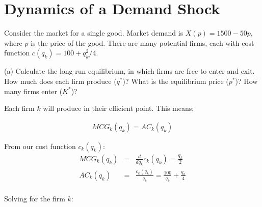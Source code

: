 \section{Dynamics of a Demand Shock}

Consider the market for a single good. Market demand is \( X(p) = 1500 - 50p \), where \( p \) is the price of the good. There are many potential firms, each with cost function \( c(q_k) = 100 + q_k^2/4 \).

\begin{tcolorbox}
    (a) Calculate the long-run equilibrium, in which firms are free to enter and exit. How much does each firm produce (\( q^* \))? What is the equilibrium price (\( p^* \))? How many firms enter (\( K^* \))?
\end{tcolorbox}

Each firm \( k \) will produce in their efficient point. This means:

\begin{eqnarray*}
MCG_k(q_k) = AC_k(q_k)
\end{eqnarray*}

From our cost function \( c_k(q_k) \):
\begin{eqnarray*}
MCG_k(q_k) &=& \frac{d}{dq_k} c_k(q_k) = \frac{q_k}{2}\\
AC_k(q_k) &=& \frac{c_k(q_k)}{q_k} = \frac{100}{q_k} + \frac{q_k}{4}\\
\end{eqnarray*}

Solving for the firm \( k \):
\begin{tcolorbox}
    
\end{tcolorbox}
\begin{tcolorbox}
    
\end{tcolorbox}
\begin{tcolorbox}
    
\end{tcolorbox}
